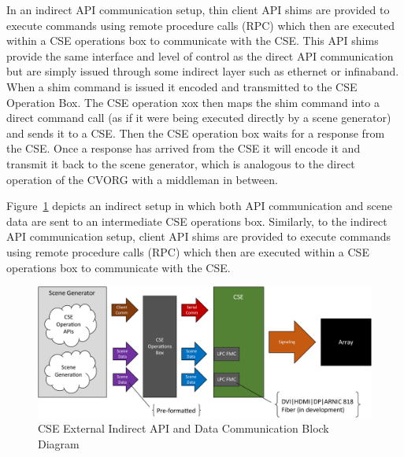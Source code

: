         In an indirect API communication setup, thin client API shims are provided to execute commands using remote procedure calls (RPC) which then are executed within a CSE operations box to communicate with the CSE\cite{CampbellEtAl2019}. This API shims provide the same interface and level of control as the direct API communication but are simply issued through some indirect layer such as ethernet or infinaband. When a shim command is issued it encoded and transmitted to the CSE Operation Box. The CSE operation xox then maps the shim command into a direct command call (as if it were being executed directly by a scene generator) and sends it to a CSE. Then the CSE operation box waits for a response from the CSE. Once a response has arrived from the CSE it will encode it and transmit it back to the scene generator, which is analogous to the direct operation of the CVORG with a middleman in between.

        Figure~\ref{fig:external_cse_comm_indirect} depicts an indirect setup in which both API communication and scene data are sent to an intermediate CSE operations box. Similarly, to the indirect API communication setup, client API shims are provided to execute commands using remote procedure calls (RPC) which then are executed within a CSE operations box to communicate with the CSE.

        \begin{figure}
            \centering
            \includegraphics[width=1.0\textwidth]{fig/external_cse_comm_indirect.pdf}
            \caption{CSE External Indirect API and Data Communication Block Diagram}
            \label{fig:external_cse_comm_indirect}
        \end{figure}

